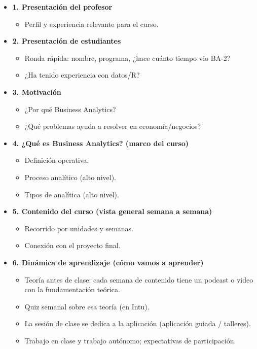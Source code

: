 \documentclass{article}
\begin{document}
\begin{itemize}
\item \textbf{1. Presentación del profesor}
\begin{itemize}
  \item Perfil y experiencia relevante para el curso.
\end{itemize}

\item \textbf{2. Presentación de estudiantes}
\begin{itemize}
  \item Ronda rápida: nombre, programa, ¿hace cuánto tiempo vio BA-2?
  \item ¿Ha tenido experiencia con datos/R?
\end{itemize}

\item \textbf{3. Motivación}
\begin{itemize}
  \item ¿Por qué Business Analytics?
  \item ¿Qué problemas ayuda a resolver en economía/negocios?
\end{itemize}

\item \textbf{4. ¿Qué es Business Analytics? (marco del curso)}
\begin{itemize}
  \item Definición operativa.
  \item Proceso analítico (alto nivel).
  \item Tipos de analítica (alto nivel).
\end{itemize}

\item \textbf{5. Contenido del curso (vista general semana a semana)}
\begin{itemize}
  \item Recorrido por unidades y semanas.
  \item Conexión con el proyecto final.
\end{itemize}

\item \textbf{6. Dinámica de aprendizaje (cómo vamos a aprender)}
\begin{itemize}
  \item Teoría antes de clase: cada semana de contenido tiene un podcast o video con la fundamentación teórica.
  \item Quiz semanal sobre esa teoría (en Intu).
  \item La sesión de clase se dedica a la aplicación (aplicación guiada / talleres).
  \item Trabajo en clase y trabajo autónomo; expectativas de participación.
\end{itemize}


\end{itemize}
\end{document}
